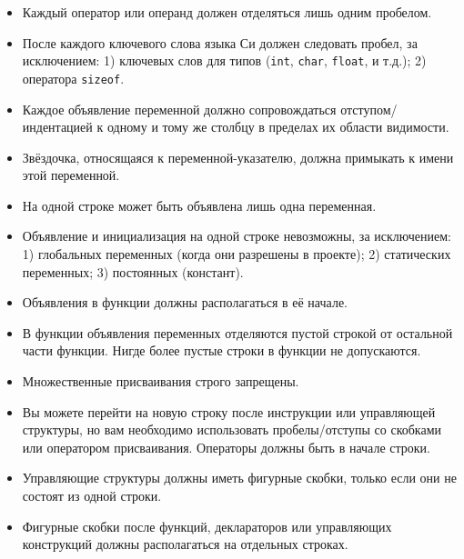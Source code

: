 \documentclass{42-ru}
\begin{document}
\begin{itemize}
                \item Каждый оператор или операнд должен отделяться лишь одним пробелом.

                \item После каждого ключевого слова языка Си должен следовать пробел, за исключением: 1) ключевых слов для типов (\texttt{int}, \texttt{char}, \texttt{float}, и т.д.); 2) оператора \texttt{sizeof}.

                \item Каждое объявление переменной должно сопровождаться отступом/индентацией к одному и тому же столбцу в пределах их области видимости.

                \item Звёздочка, относящаяся к переменной-указателю, должна примыкать к имени этой переменной.

                \item На одной строке может быть объявлена лишь одна переменная.

                \item Объявление и инициализация на одной строке невозможны, за исключением: 1) глобальных переменных (когда они разрешены в проекте); 2) статических переменных; 3) постоянных (констант).

                \item Объявления в функции должны располагаться в её начале.

                \item В функции объявления переменных отделяются пустой строкой от остальной части функции. Нигде более пустые строки в функции не допускаются.

                \item Множественные присваивания строго запрещены.

                \item Вы можете перейти на новую строку после инструкции или управляющей структуры,
                    но вам необходимо использовать пробелы/отступы со скобками или оператором присваивания.
                    Операторы должны быть в начале строки.

                \item Управляющие структуры должны иметь фигурные скобки, только если они не состоят из одной строки.

                \item Фигурные скобки после функций, деклараторов или управляющих конструкций должны располагаться на отдельных строках.

            \end{itemize}
\end{document}
